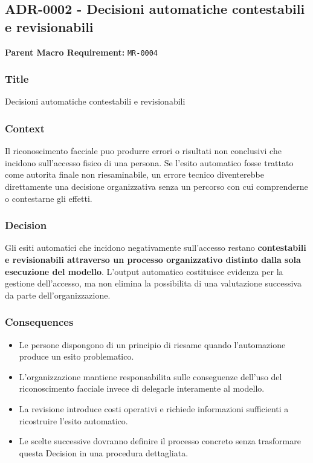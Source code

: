 \documentclass[
  10pt,
]{article}
\providecommand{\tightlist}{%
  \setlength{\itemsep}{0pt}\setlength{\parskip}{0pt}}
\begin{document}
\subsection{ADR-0002 - Decisioni automatiche contestabili e
revisionabili}\label{adr-0002---decisioni-automatiche-contestabili-e-revisionabili}

\textbf{Parent Macro Requirement:} \texttt{MR-0004}

\subsubsection{Title}\label{title-7}

Decisioni automatiche contestabili e revisionabili

\subsubsection{Context}\label{context-7}

Il riconoscimento facciale puo produrre errori o risultati non
conclusivi che incidono sull'accesso fisico di una persona. Se l'esito
automatico fosse trattato come autorita finale non riesaminabile, un
errore tecnico diventerebbe direttamente una decisione organizzativa
senza un percorso con cui comprenderne o contestarne gli effetti.

\subsubsection{Decision}\label{decision-7}

Gli esiti automatici che incidono negativamente sull'accesso restano
\textbf{contestabili e revisionabili attraverso un processo
organizzativo distinto dalla sola esecuzione del modello}. L'output
automatico costituisce evidenza per la gestione dell'accesso, ma non
elimina la possibilita di una valutazione successiva da parte
dell'organizzazione.

\subsubsection{Consequences}\label{consequences-7}

\begin{itemize}
\tightlist
\item
  Le persone dispongono di un principio di riesame quando l'automazione
  produce un esito problematico.
\item
  L'organizzazione mantiene responsabilita sulle conseguenze dell'uso
  del riconoscimento facciale invece di delegarle interamente al
  modello.
\item
  La revisione introduce costi operativi e richiede informazioni
  sufficienti a ricostruire l'esito automatico.
\item
  Le scelte successive dovranno definire il processo concreto senza
  trasformare questa Decision in una procedura dettagliata.
\end{itemize}
\end{document}
